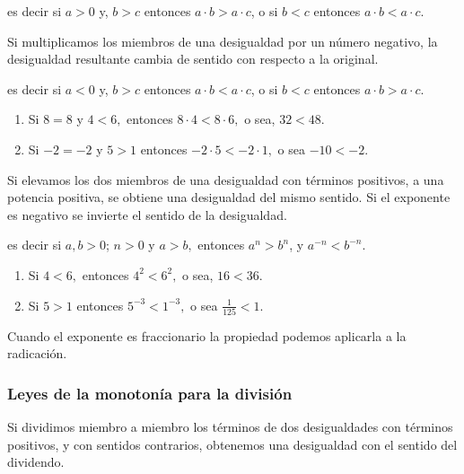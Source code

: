 es decir si $a>0$ y, $b>c$ entonces $a\cdot b>a\cdot c$, o si $b<c$
entonces $a\cdot b<a\cdot c$.

\begin{ley}{}

Si multiplicamos los miembros de una desigualdad por un número negativo,
la desigualdad resultante cambia de sentido con respecto a la original.

\end{ley}

es decir si $a<0$ y, $b>c$ entonces $a\cdot b<a\cdot c$, o si $b<c$
entonces $a\cdot b>a\cdot c$.\begin{ejemplos}
\begin{enumerate}
\item Si $8=8$ y $4<6,$ entonces $8\cdot4<8\cdot6,$ o sea, $32<48.$
\item Si $-2=-2$ y $5>1$ entonces $-2\cdot5<-2\cdot1,$ o sea $-10<-2$.
\end{enumerate}
\end{ejemplos}

\begin{ley}{\label{prop:lmep}}

Si elevamos los dos miembros de una desigualdad con términos positivos,
a una potencia positiva, se obtiene una desigualdad del mismo sentido.
Si el exponente es negativo se invierte el sentido de la desigualdad.

\end{ley}

es decir si $a,b>0$; $n>0$ y $a>b,$ entonces $a^{n}>b^{n}$, y
$a^{-n}<b^{-n}.$

\begin{ejemplos}
\begin{enumerate}
\item Si $4<6,$ entonces $4^{2}<6^{2},$ o sea, $16<36.$
\item Si $5>1$ entonces $5^{-3}<1^{-3},$ o sea $\frac{1}{125}<1$.
\end{enumerate}
\end{ejemplos}

\obs Cuando el exponente es fraccionario la propiedad 
podemos aplicarla a la radicación.

\subsubsection{Leyes de la monotonía para la división\vspace*{10pt}
}

\begin{ley}{}

Si dividimos miembro a miembro los términos de dos desigualdades con
términos positivos, y con sentidos contrarios, obtenemos una desigualdad
con el sentido del dividendo.

\end{ley}

